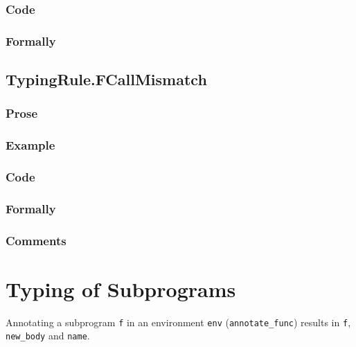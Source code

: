 \documentclass{book}
\begin{document}
  \subsection{Code}

\begin{emptyformal}
    \subsection{Formally}
\end{emptyformal}


\section{TypingRule.FCallMismatch \label{sec:TypingRule.FCallMismatch}}

  \subsection{Prose}

  \subsection{Example}

  \subsection{Code}

  \subsection{Formally}

  \subsection{Comments}

\chapter{Typing of Subprograms}
Annotating a subprogram \texttt{f} in an environment \texttt{env}
(\texttt{annotate\_func}) results in \texttt{f}, \texttt{new\_body} and
\texttt{name}.
\end{document}
